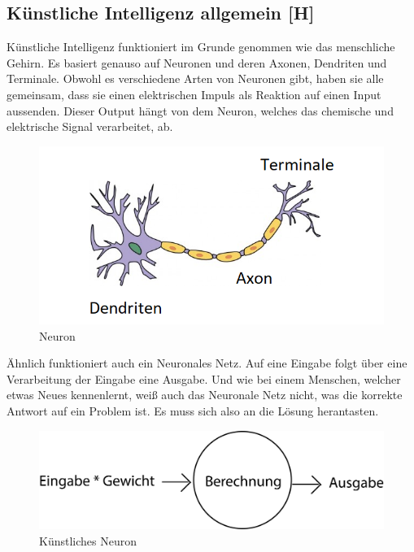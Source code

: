 \subsection{Künstliche Intelligenz allgemein [H]}\label{tech:ki:head}
Künstliche Intelligenz funktioniert im Grunde genommen wie das menschliche Gehirn. Es basiert genauso auf Neuronen und deren Axonen, Dendriten und Terminale. Obwohl es verschiedene Arten von Neuronen gibt, haben sie alle gemeinsam, dass sie einen elektrischen Impuls als Reaktion auf einen Input aussenden. Dieser Output hängt von dem Neuron, welches das chemische und elektrische Signal verarbeitet, ab.

\begin{figure}[H]
    \centering
    \includegraphics[scale=1]{pics/Neuron.png}
    \caption{Neuron \cite{tech:neuron:cite}}
    \label{fig:tech:Neuron}
\end{figure}

Ähnlich funktioniert auch ein Neuronales Netz. Auf eine Eingabe folgt über eine Verarbeitung der Eingabe eine Ausgabe. Und wie bei einem Menschen, welcher etwas Neues kennenlernt, weiß auch das Neuronale Netz nicht, was die korrekte Antwort auf ein Problem ist. Es muss sich also an die Lösung herantasten.

\begin{figure}[H]
    \centering
    \includegraphics[scale=0.3]{pics/eba.png}
    \caption{Künstliches Neuron}
    \label{fig:tech:eba}
\end{figure}

